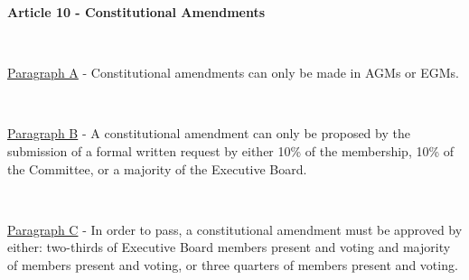 \large{\textbf{Article 10 - Constitutional Amendments}}

~

\underline{Paragraph A} - Constitutional amendments can only be made in
AGMs or EGMs.

~

\underline{Paragraph B} - A constitutional amendment can only be
proposed by the submission of a formal written request by either 10\% of
the membership, 10\% of the Committee, or a majority of the Executive Board.

~

\underline{Paragraph C} - In order to pass, a constitutional amendment
must 
be approved by either: two-thirds of Executive Board members present 
and voting and majority of members present and voting, or three quarters of 
members present and voting. 

~
